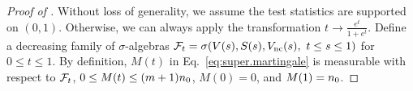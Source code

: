 \begin{proof}[Proof of ]
Without loss of generality, we assume the test statistics are supported on $(0,1)$.
Otherwise, we can always apply the transformation $t \to \frac{e^t}{1 + e^t}$.
Define a decreasing family of $\sigma$-algebras $\mathcal{F}_t = \sigma({V}(s), {S}(s), {V_{\text{nc}}}(s), ~t \le s \le 1)$ for $0 \le t \le 1$.
By definition, $M(t)$ in Eq.~\eqref{eq:super.martingale} is measurable with respect to $\mathcal{F}_t$, $0 \le M(t) \le (m+1){n_0}$, $M(0) = 0$, and $M(1) = {n_0}$.



\end{proof}
